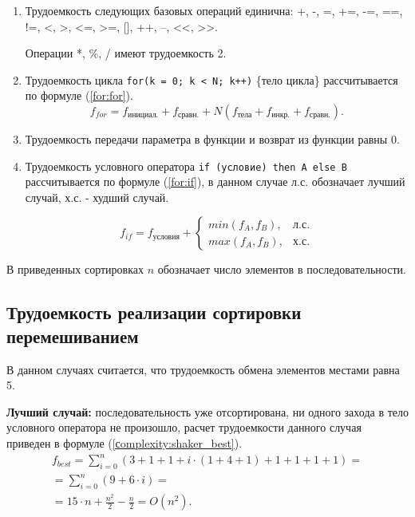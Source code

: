 \begin{enumerate}
	
	\item Трудоемкость следующих базовых операций единична:
	+, -, =, +=, -=, ==, !=, <, >, <=, >=, [], ++, --, <<, >>.
	
	Операции *, \%, / имеют трудоемкость 2.
	
	\item Трудоемкость цикла \texttt{for(k = 0; k < N; k++)} \{тело цикла\} рассчитывается по формуле (\ref{for:for}).
	\begin{equation}
		\label{for:for}
		f_{for} = f_{\text{инициал.}} + f_{\text{сравн.}} + N(f_{\text{тела}} + f_{\text{инкр.}} + f_{\text{сравн.}}).
	\end{equation}
	
	\item Трудоемкость передачи параметра в функции и возврат из функции равны 0.
	\item Трудоемкость условного оператора \texttt{if (условие) then A else B} рассчитывается по формуле (\ref{for:if}), в данном случае л.с. обозначает лучший случай, х.с. - худший случай.
	
	\begin{equation}
		\label{for:if}
		f_{if} = f_{\text{условия}} +
		\begin{cases}
			min(f_A, f_B), & \text{л.с.}\\
			max(f_A, f_B), & \text{х.с.}
		\end{cases}
	\end{equation}
	
\end{enumerate}


В приведенных сортировках $n$ обозначает число элементов в последовательности.
\subsection{Трудоемкость реализации сортировки перемешиванием}
В данном случаях считается, что трудоемкость обмена элементов местами равна 5.

\textbf{Лучший случай:} последовательность уже отсортирована, ни одного захода в тело условного оператора не произошло, расчет трудоемкости данного случая приведен в формуле (\ref{сomplexity:shaker_best}).
\begin{equation}
	\label{сomplexity:shaker_best}
	\begin{gathered}
		f_{best} =\sum_{i=0}^{n}  (3 +  1 + 1 + i \cdot (1 +4  + 1) + 1 +1 +1 +1) =\\ =\sum_{i=0}^{n} (9 + 6 \cdot i) = \\
		= 15 \cdot n + \frac{n^2}{2} - \frac{n}{2}  = O(n^2).
	\end{gathered}
\end{equation}

